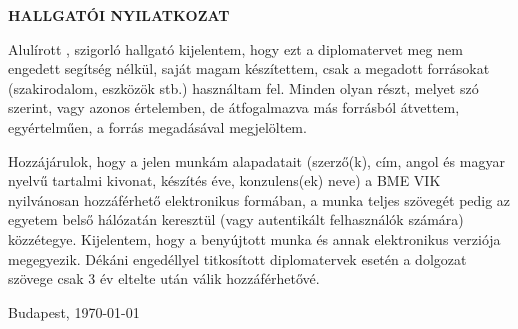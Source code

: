 \begin{center}
\large
\textbf{HALLGATÓI NYILATKOZAT}\\
\end{center}

Alulírott \emph{\vikszerzo}, szigorló hallgató kijelentem, hogy ezt a
diplomatervet meg nem engedett segítség nélkül, saját magam készítettem, csak a
megadott forrásokat (szakirodalom, eszközök stb.) használtam fel.  Minden olyan
részt, melyet szó szerint, vagy azonos értelemben, de átfogalmazva más forrásból
átvettem, egyértelműen, a forrás megadásával megjelöltem.

Hozzájárulok, hogy a jelen munkám alapadatait (szerző(k), cím, angol és magyar
nyelvű tartalmi kivonat, készítés éve, konzulens(ek) neve) a BME VIK nyilvánosan
hozzáférhető elektronikus formában, a munka teljes szövegét pedig az egyetem
belső hálózatán keresztül (vagy autentikált felhasználók számára) közzétegye.
Kijelentem, hogy a benyújtott munka és annak elektronikus verziója megegyezik.
Dékáni engedéllyel titkosított diplomatervek esetén a dolgozat szövege csak 3 év
eltelte után válik hozzáférhetővé.

\begin{flushleft}
\vspace*{1cm}
Budapest, \today
\end{flushleft}

\begin{flushright}
 \vspace*{1cm}
 \makebox[7cm]{\rule{6cm}{.4pt}}\\
 \makebox[7cm]{\emph{\vikszerzo}}\\
\end{flushright}
\thispagestyle{empty}

\vfill
\clearpage
\thispagestyle{empty}
